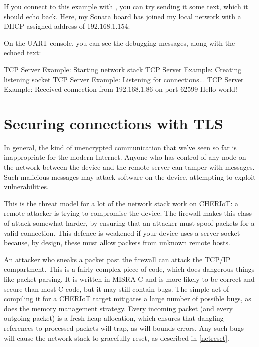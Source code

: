 If you connect to this example with , you can try sending it some text, which it should echo back.
Here, my Sonata board has joined my local network with a DHCP-assigned address of 192.168.1.154:


On the UART console, you can see the debugging messages, along with the echoed text:

\begin{console}
TCP Server Example: Starting network stack
TCP Server Example: Creating listening socket
TCP Server Example: Listening for connections...
TCP Server Example: Received connection from 192.168.1.86 on port 62599
Hello world!
\end{console}

\section{Securing connections with TLS}

In general, the kind of unencrypted communication that we've seen so far is inappropriate for the modern Internet.
Anyone who has control of any node on the network between the device and the remote server can tamper with messages.
Such malicious messages may attack software on the device, attempting to exploit vulnerabilities.

This is the threat model for a lot of the network stack work on CHERIoT: a remote attacker is trying to compromise the device.
The firewall makes this class of attack somewhat harder, by ensuring that an attacker must spoof packets for a valid connection.
This defence is weakened if your device uses a server socket because, by design, these must allow packets from unknown remote hosts.

An attacker who sneaks a packet past the firewall can attack the TCP/IP compartment.
This is a fairly complex piece of code, which does dangerous things like packet parsing.
It is written in MISRA C and is more likely to be correct and secure than most C code, but it may still contain bugs.
The simple act of compiling it for a CHERIoT target mitigates a large number of possible bugs, as does the memory management strategy.
Every incoming packet (and every outgoing packet) is a fresh heap allocation, which ensures that dangling references to processed packets will trap, as will bounds errors.
Any such bugs will cause the network stack to gracefully reset, as described in \ref{netreset}.

